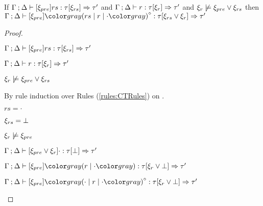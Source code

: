 \begin{lem}
  \label{lem:rule-append}
  If $\Gamma \mathbin{;} \Delta \vdash [\xi_{pre}] rs : \tau [\xi_{rs}] \Rightarrow \tau'$ and $\Gamma \mathbin{;} \Delta \vdash r : \tau [\xi_r] \Rightarrow \tau'$ and $\xi_r \not\models \xi_{pre} \vee \xi_{rs}$ then $\chrulstyp{\Gamma}{\Delta}{\xi_{pre}}{\rmpointer{\zruls{rs}{r}{\cdot}}}{\tau}{\cor{\xi_{rs}}{\xi_r}}{\tau'}$
\end{lem}
\begin{proof}
  \begin{pfsteps*}
  \item $\Gamma \mathbin{;} \Delta \vdash [\xi_{pre}] rs : \tau [\xi_{rs}] \Rightarrow \tau'$  
  \item $\Gamma \mathbin{;} \Delta \vdash r : \tau [\xi_r] \Rightarrow \tau'$  
  \item $\xi_r \not\models \xi_{pre} \vee \xi_{rs}$  
  \end{pfsteps*}
  By rule induction over Rules (\ref{rules:CTRules}) on .
  \begin{byCases}
    
  \item[\text{(\ref{rule:CTZeroRule})}]
    \begin{pfsteps*}
    \item $rs = \cdot$ 
    \item $\xi_{rs} = \bot$ 
    \item $\xi_r \not\models \xi_{pre}$  
    \item $\Gamma \mathbin{;} \Delta \vdash [\xi_{pre} \vee \xi_r] \cdot : \tau [\bot] \Rightarrow \tau'$  
    \item $\chrulstyp{\Gamma}{\Delta}{\xi_{pre}}{\hrulesP{r}{\cdot}}{\tau}{\cor{\xi_r}{\cfalsity}}{\tau'}$  
    \item $\chrulstyp{\Gamma}{\Delta}{\xi_{pre}}{\rmpointer{\zruls{\cdot}{r}{\cdot}}}{\tau}{\cor{\xi_r}{\cfalsity}}{\tau'}$ 
    \end{pfsteps*}


\end{byCases}
\end{proof}

